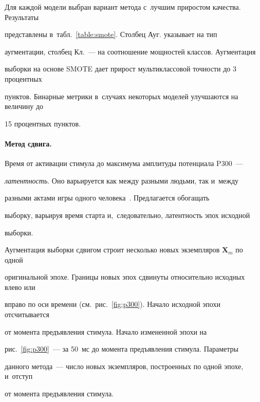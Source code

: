 Для каждой модели выбран вариант метода с~лучшим приростом качества. Результаты 

представлены в~табл.~\ref{table:smote}. Столбец Ауг. указывает на тип 

аугментации, столбец Кл.~--- на соотношение мощностей классов. Аугментация 

выборки на основе SMOTE дает прирост мультиклассовой точности до 3 процентных 

пунктов. Бинарные метрики в~случаях некоторых моделей улучшаются на величину до 

15 процентных пунктов.



\paragraph*{Метод сдвига.}

Время от активации стимула до максимума амплитуды потенциала  P300~--- 

\textit{латентность}. Оно варьируется как между разными людьми, так и~между 

разными актами игры одного человека~\cite{latency_eeg}. Предлагается обогащать 

выборку, варьируя время старта и,~следовательно, латентность эпох исходной 

выборки.



Аугментация выборки сдвигом строит несколько новых экземпляров $\mathbf{X}_m$ по одной 

оригинальной эпохе. Границы новых эпох сдвинуты относительно исходных влево или 

вправо по оси времени (см.\ рис.~\ref{fig:p300}). Начало исходной эпохи отсчитывается 

от момента предъявления стимула. Начало измененной эпохи на 

рис.~\ref{fig:p300}~--- за 50~мс до момента предъявления стимула. Параметры 

данного метода~--- число новых экземпляров, построенных по одной эпохе, и~отступ 

от момента предъявления стимула.



